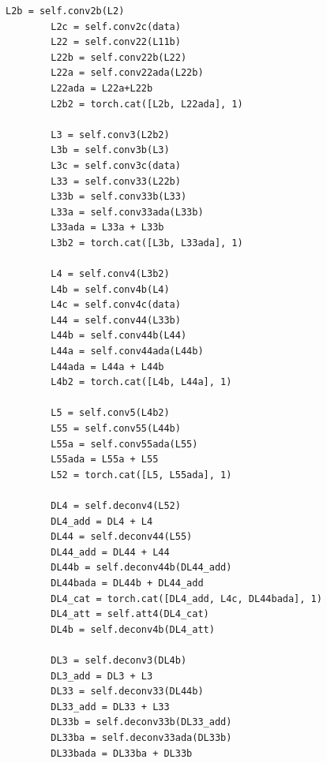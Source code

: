 \begin{lstlisting}[caption= Продолжение листинга A.1]
        L2b = self.conv2b(L2)
        L2c = self.conv2c(data)
        L22 = self.conv22(L11b)
        L22b = self.conv22b(L22)
        L22a = self.conv22ada(L22b)
        L22ada = L22a+L22b
        L2b2 = torch.cat([L2b, L22ada], 1)

        L3 = self.conv3(L2b2)
        L3b = self.conv3b(L3)
        L3c = self.conv3c(data)
        L33 = self.conv33(L22b)
        L33b = self.conv33b(L33)
        L33a = self.conv33ada(L33b)
        L33ada = L33a + L33b
        L3b2 = torch.cat([L3b, L33ada], 1)

        L4 = self.conv4(L3b2)
        L4b = self.conv4b(L4)
        L4c = self.conv4c(data)
        L44 = self.conv44(L33b)
        L44b = self.conv44b(L44)
        L44a = self.conv44ada(L44b)
        L44ada = L44a + L44b
        L4b2 = torch.cat([L4b, L44a], 1)

        L5 = self.conv5(L4b2)
        L55 = self.conv55(L44b)
        L55a = self.conv55ada(L55)
        L55ada = L55a + L55
        L52 = torch.cat([L5, L55ada], 1)

        DL4 = self.deconv4(L52)
        DL4_add = DL4 + L4
        DL44 = self.deconv44(L55)
        DL44_add = DL44 + L44
        DL44b = self.deconv44b(DL44_add)
        DL44bada = DL44b + DL44_add
        DL4_cat = torch.cat([DL4_add, L4c, DL44bada], 1)
        DL4_att = self.att4(DL4_cat)
        DL4b = self.deconv4b(DL4_att)

        DL3 = self.deconv3(DL4b)
        DL3_add = DL3 + L3
        DL33 = self.deconv33(DL44b)
        DL33_add = DL33 + L33
        DL33b = self.deconv33b(DL33_add)
        DL33ba = self.deconv33ada(DL33b)
        DL33bada = DL33ba + DL33b
\end{lstlisting}

